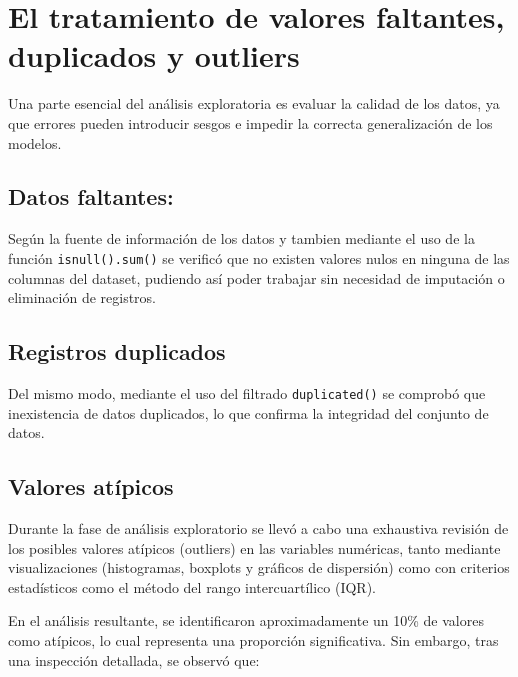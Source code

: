 \documentclass{report}[14pt]
\begin{document}
\section{El tratamiento de valores faltantes, duplicados y outliers}
Una parte esencial del análisis exploratoria es evaluar la calidad de los datos, ya que errores pueden introducir sesgos e impedir la correcta generalización de los modelos.

\subsection{Datos faltantes:} 
Según la fuente de información de los datos \cite{noauthor_undated-nc} y tambien mediante el uso de la función \texttt{isnull().sum()} se verificó que no existen valores nulos en ninguna de las columnas del dataset, pudiendo así poder trabajar sin necesidad de imputación o eliminación de registros.

 
\subsection{Registros duplicados} Del mismo modo, mediante el uso del filtrado \texttt{duplicated()} se comprobó que inexistencia de datos duplicados, lo que confirma la integridad del conjunto de datos.

\subsection{Valores atípicos} Durante la fase de análisis exploratorio se llevó a cabo una exhaustiva revisión de los posibles valores atípicos (outliers) en las variables numéricas, tanto mediante visualizaciones (histogramas, boxplots y gráficos de dispersión) como con criterios estadísticos como el método del rango intercuartílico (IQR).

En el análisis resultante, se identificaron aproximadamente un 10\% de valores como atípicos, lo cual representa una proporción significativa. Sin embargo, tras una inspección detallada, se observó que:
\end{document}
